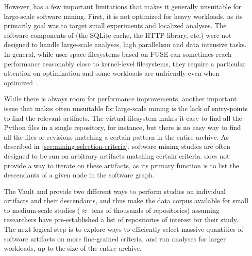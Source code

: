 However, \SWHFS{} has a few important limitations that makes it generally
unsuitable for large-scale software mining. First, it is not optimized for
heavy workloads, as its primarily goal was to target small experiments and
localized analyses. The software components of \SWHFS{} (the SQLite cache, the
HTTP library, etc.) were not designed to handle large-scale analyses, high
parallelism and data intensive tasks. In general, while user-space filesystems
based on FUSE can sometimes reach performance reasonably close to kernel-level
filesystems, they require a particular attention on optimization and some
workloads are unfriendly even when optimized~\cite{vangoor2017fuseperf}.

While there is always room for performance improvements, another important
issue that makes \SWHFS{} often unsuitable for large-scale mining is the lack of
entry-points to find the relevant artifacts. The virtual filesystem makes
it easy to find all the Python files in a single repository, for instance,
but there is no easy way to find all the files or revisions matching a certain
pattern in the entire archive. As described in
\cref{sec:mining-selection-criteria}, software mining studies are often
designed to be run on arbitrary artifacts matching certain criteria. \SWHFS{}
does not provide a way to iterate on these artifacts, as its primary function
is to list the descendants of a given node in the software graph.

\bigskip

The Vault and \SWHFS{} provide two different ways to perform studies on
individual artifacts and their descendants, and thus make the data corpus
available for small to medium-scale studies ($\approx$ tens of thousands of
repositories) assuming researchers have pre-established a list of repositories
of interest for their study.
The next logical step is to explore ways to efficiently select massive
quantities of software artifacts on more fine-grained criteria, and
run analyses for larger workloads, up to the size of the entire archive.
